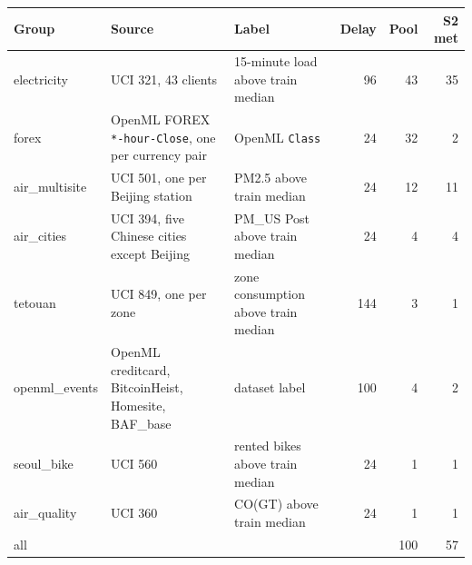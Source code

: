 \begin{tabular}{@{}l p{4.6cm} p{3.4cm} r r r@{}}
\toprule
Group & Source & Label & Delay & Pool & S2 met \\
\midrule
electricity & UCI 321, 43 clients & 15-minute load above train median & 96 & 43 & 35 \\
forex & OpenML FOREX \texttt{*-hour-Close}, one per currency pair & OpenML \texttt{Class} & 24 & 32 & 2 \\
air\_multisite & UCI 501, one per Beijing station & PM2.5 above train median & 24 & 12 & 11 \\
air\_cities & UCI 394, five Chinese cities except Beijing & PM\_US Post above train median & 24 & 4 & 4 \\
tetouan & UCI 849, one per zone & zone consumption above train median & 144 & 3 & 1 \\
openml\_events & OpenML creditcard, BitcoinHeist, Homesite, BAF\_base & dataset label & 100 & 4 & 2 \\
seoul\_bike & UCI 560 & rented bikes above train median & 24 & 1 & 1 \\
air\_quality & UCI 360 & CO(GT) above train median & 24 & 1 & 1 \\
\midrule
all & & & & 100 & 57 \\
\bottomrule
\end{tabular}
